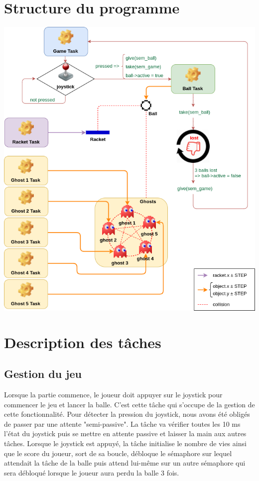 \documentclass[a4paper]{article}
\begin{document}
\section{Structure du programme}
\begin{center}
\includegraphics[scale=0.6]{ghostbusters.png}
\end{center}

\section{Description des tâches}
\subsection{Gestion du jeu}
Lorsque la partie commence, le joueur doit appuyer sur le joystick pour
commencer le jeu et lancer la balle. C'est cette tâche qui s'occupe de la
gestion de cette fonctionnalité. Pour détecter la pression du joystick, nous avons
été obligés de passer par une attente "semi-passive". La tâche va vérifier toutes
les 10 ms l'état du joystick puis se mettre en attente passive et laisser la main
aux autres tâches. Lorsque le joystick est appuyé, la tâche initialise le nombre
de vies ainsi que le score du joueur, sort de sa boucle, débloque le sémaphore
sur lequel attendait la tâche de la balle puis attend lui-même sur un autre
sémaphore qui sera débloqué lorsque le joueur aura perdu la balle 3 fois.
\end{document}
